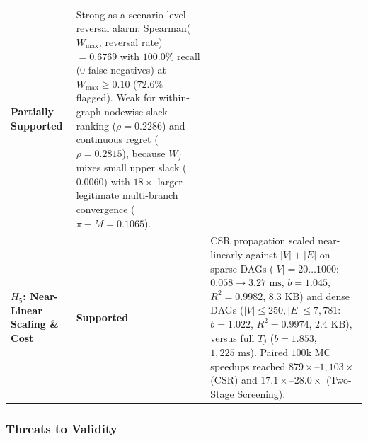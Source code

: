 \begin{table}[htbp]
\begin{tabularx}{\textwidth}{@{}>{\raggedright\arraybackslash}p{2.35cm} >{\raggedright\arraybackslash}p{2.05cm} L@{}}
\textbf{Partially Supported} &
Strong as a scenario-level reversal alarm: Spearman($W_{\max}$, reversal rate) $= 0.6769$ with $100.0\%$ recall ($0$ false negatives) at $W_{\max}\ge 0.10$ ($72.6\%$ flagged). Weak for within-graph nodewise slack ranking ($\rho = 0.2286$) and continuous regret ($\rho = 0.2815$), because $W_j$ mixes small upper slack ($0.0060$) with $18\times$ larger legitimate multi-branch convergence ($\pi-M=0.1065$). \\
\addlinespace
\textbf{$H_5$: Near-Linear Scaling \& Cost} &
\textbf{Supported} &
CSR propagation scaled near-linearly against $|V|+|E|$ on sparse DAGs ($|V|=20\dots 1000$: $0.058\to 3.27\text{ ms}$, $b=1.045$, $R^2=0.9982$, $8.3\text{ KB}$) and dense DAGs ($|V|\le 250, |E|\le 7,781$: $b=1.022$, $R^2=0.9974$, $2.4\text{ KB}$), versus full $T_j$ ($b=1.853$, $1,225\text{ ms}$). Paired $100\text{k}$ MC speedups reached $879\times$--$1,103\times$ (CSR) and $17.1\times$--$28.0\times$ (Two-Stage Screening). \\
\bottomrule
\end{tabularx}
\end{table}

\subsubsection{Threats to Validity}

